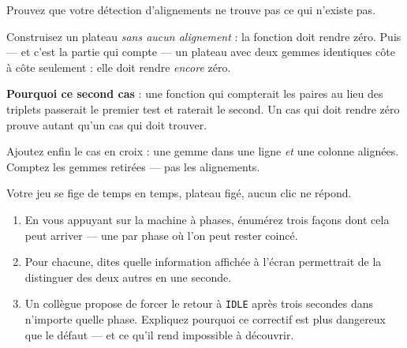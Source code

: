 \begin{nkdemo}
Prouvez que votre détection d'alignements ne trouve pas ce qui n'existe pas.

Construisez un plateau \emph{sans aucun alignement} : la fonction doit rendre
zéro. Puis --- et c'est la partie qui compte --- un plateau avec deux gemmes
identiques côte à côte seulement : elle doit rendre \emph{encore} zéro.

\textbf{Pourquoi ce second cas} : une fonction qui compterait les paires au lieu
des triplets passerait le premier test et raterait le second. Un cas qui doit
rendre zéro prouve autant qu'un cas qui doit trouver.

Ajoutez enfin le cas en croix : une gemme dans une ligne \emph{et} une colonne
alignées. Comptez les gemmes retirées --- pas les alignements.
\end{nkdemo}

\begin{nklogique}
Votre jeu se fige de temps en temps, plateau figé, aucun clic ne répond.

\begin{enumerate}
\item En vous appuyant sur la machine à phases, énumérez trois façons dont cela
      peut arriver --- une par phase où l'on peut rester coincé.
\item Pour chacune, dites quelle information affichée à l'écran permettrait de
      la distinguer des deux autres en une seconde.
\item Un collègue propose de forcer le retour à \texttt{IDLE} après trois
      secondes dans n'importe quelle phase. Expliquez pourquoi ce correctif est
      plus dangereux que le défaut --- et ce qu'il rend impossible à découvrir.
\end{enumerate}
\end{nklogique}
